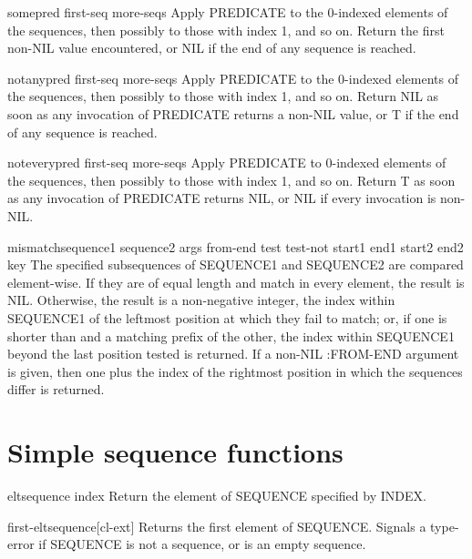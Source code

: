 \documentclass[10pt,english]{book}
\begin{document}
\begin{function}{some}{pred first-seq \rest more-seqs}
  Apply PREDICATE to the 0-indexed elements of the sequences, then
  possibly to those with index 1, and so on. Return the first
  non-NIL value encountered, or NIL if the end of any sequence is reached.
\end{function}

\begin{function}{notany}{pred first-seq \rest more-seqs}
  Apply PREDICATE to the 0-indexed elements of the sequences, then
  possibly to those with index 1, and so on. Return NIL as soon
  as any invocation of PREDICATE returns a non-NIL value, or T if the end
  of any sequence is reached.
\end{function}

\begin{function}{notevery}{pred first-seq \rest more-seqs}
  Apply PREDICATE to 0-indexed elements of the sequences, then
  possibly to those with index 1, and so on. Return T as soon
  as any invocation of PREDICATE returns NIL, or NIL if every invocation
  is non-NIL.
\end{function}

\begin{function}{mismatch}{sequence1 sequence2 \rest args \key from-end test test-not start1 end1 start2
    end2 key}
  The specified subsequences of SEQUENCE1 and SEQUENCE2 are compared
  element-wise. If they are of equal length and match in every element, the
  result is NIL. Otherwise, the result is a non-negative integer, the index
  within SEQUENCE1 of the leftmost position at which they fail to match; or,
  if one is shorter than and a matching prefix of the other, the index within
  SEQUENCE1 beyond the last position tested is returned. If a non-NIL
  :FROM-END argument is given, then one plus the index of the rightmost
  position in which the sequences differ is returned.
\end{function}

\section{Simple sequence functions}
\label{sec:simple-sequ-funct}

\begin{accessor}{elt}{sequence index}
  Return the element of SEQUENCE specified by INDEX.
\end{accessor}

\begin{function}{first-elt}{sequence}[cl-ext]
  Returns the first element of SEQUENCE. Signals a type-error if SEQUENCE is
  not a sequence, or is an empty sequence.
\end{function}
\end{document}
